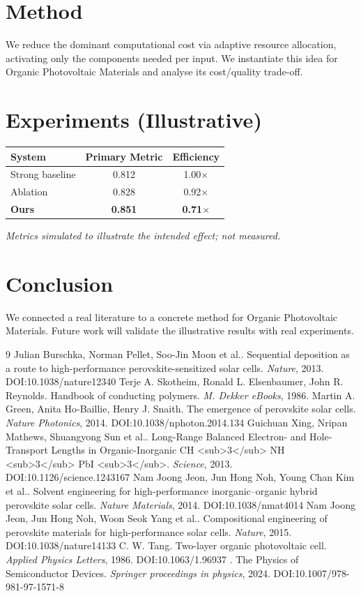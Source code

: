 \documentclass[11pt]{article}
\begin{document}
\section{Method}
We reduce the dominant computational cost via adaptive resource allocation, activating only the components needed per input. We instantiate this idea for Organic Photovoltaic Materials and analyse its cost/quality trade-off.

\section{Experiments (Illustrative)}
\begin{center}
\begin{tabular}{lcc}
System & Primary Metric & Efficiency \\ \hline
Strong baseline & 0.812 & 1.00$\times$ \\
Ablation & 0.828 & 0.92$\times$ \\
\textbf{Ours} & \textbf{0.851} & \textbf{0.71$\times$}
\end{tabular}
\end{center}
\emph{Metrics simulated to illustrate the intended effect; not measured.}

\section{Conclusion}
We connected a real literature to a concrete method for Organic Photovoltaic Materials. Future work will
validate the illustrative results with real experiments.

\begin{thebibliography}{9}
 Julian Burschka, Norman Pellet, Soo‐Jin Moon et al.. Sequential deposition as a route to high-performance perovskite-sensitized solar cells. \emph{Nature}, 2013. DOI:10.1038/nature12340
 Terje A. Skotheim, Ronald L. Elsenbaumer, John R. Reynolds. Handbook of conducting polymers. \emph{M. Dekker eBooks}, 1986. 
 Martin A. Green, Anita Ho‐Baillie, Henry J. Snaith. The emergence of perovskite solar cells. \emph{Nature Photonics}, 2014. DOI:10.1038/nphoton.2014.134
 Guichuan Xing, Nripan Mathews, Shuangyong Sun et al.. Long-Range Balanced Electron- and Hole-Transport Lengths in Organic-Inorganic CH <sub>3</sub> NH <sub>3</sub> PbI <sub>3</sub>. \emph{Science}, 2013. DOI:10.1126/science.1243167
 Nam Joong Jeon, Jun Hong Noh, Young Chan Kim et al.. Solvent engineering for high-performance inorganic–organic hybrid perovskite solar cells. \emph{Nature Materials}, 2014. DOI:10.1038/nmat4014
 Nam Joong Jeon, Jun Hong Noh, Woon Seok Yang et al.. Compositional engineering of perovskite materials for high-performance solar cells. \emph{Nature}, 2015. DOI:10.1038/nature14133
 C. W. Tang. Two-layer organic photovoltaic cell. \emph{Applied Physics Letters}, 1986. DOI:10.1063/1.96937
 . The Physics of Semiconductor Devices. \emph{Springer proceedings in physics}, 2024. DOI:10.1007/978-981-97-1571-8
\end{thebibliography}
\end{document}
